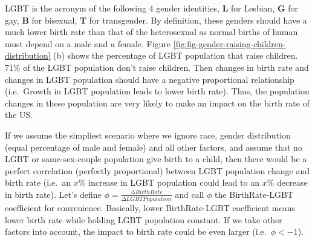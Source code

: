 \documentclass[
]{article}
\begin{document}
LGBT is the acronym of the following 4 gender identities, \textbf{L} for Lesbian, \textbf{G} for gay, \textbf{B} for bisexual, \textbf{T} for transgender. By definition, these genders should have a much lower birth rate than that of the heterosexual as normal births of human must depend on a male and a female.
Figure \ref{fig:fig-gender-raising-children-distribution} (b) shows the percentage of LGBT population that raise children. 71\% of the LGBT population don't raise children.
Then changes in birth rate and changes in LGBT population should have a negative proportional relationship (i.e.~Growth in LGBT population leads to lower birth rate).
Thus, the population changes in these population are very likely to make an impact on the birth rate of the US.

If we assume the simpliest scenario where we ignore race, gender distribution (equal percentage of male and female) and all other factors, and assume that no LGBT or same-sex-couple population give birth to a child, then there would be a perfect correlation (perfectly proportional) between LGBT population change and birth rate (i.e.~an \(x\%\) increase in LGBT population could lead to an \(x\%\) decrease in birth rate). Let's define \(\phi = \frac{\Delta Birth Rate}{\Delta LGBTPopulation}\) and call \(\phi\) the BirthRate-LGBT coefficient for convenience. Basically, lower BirthRate-LGBT coefficient means lower birth rate while holding LGBT population constant. If we take other factors into account, the impact to birth rate could be even larger (i.e.~\(\phi<-1\)).
\end{document}
